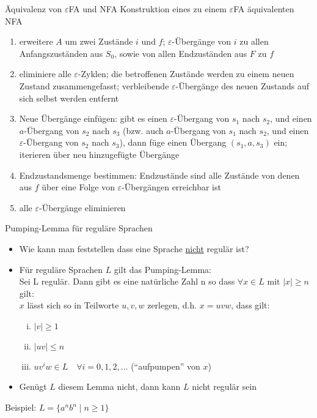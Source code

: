 \begin{frame}{Äquivalenz von $\varepsilon$FA und NFA}
	Konstruktion eines zu einem $\varepsilon$FA äquivalenten NFA
	\begin{enumerate}
		\item erweitere $A$ um zwei Zustände $i$ und $f$; $\varepsilon$-Übergänge von $i$ zu allen Anfangszuständen aus $S_0$, sowie von allen Endzuständen aus $F$ zu $f$
		\item eliminiere alle $\varepsilon$-Zyklen; die betroffenen Zustände werden zu einem neuen Zustand zusammengefasst; verbleibende $\varepsilon$-Übergänge des neuen Zustands auf sich selbst werden entfernt
		\item Neue Übergänge einfügen: gibt es einen $\varepsilon$-Übergang von $s_1$ nach $s_2$, und einen $a$-Übergang von $s_2$ nach $s_3$ (bzw. auch $a$-Übergang von $s_1$ nach $s_2$, und einen $\varepsilon$-Übergang von $s_2$ nach $s_3$), dann füge einen Übergang $(s_1,a,s_3)$ ein; iterieren über neu hinzugefügte Übergänge
		\item Endzustandsmenge bestimmen: Endzustände sind alle Zustände von
		denen aus $f$ über eine Folge von $\varepsilon$-Übergängen erreichbar ist
		\item alle $\varepsilon$-Übergänge eliminieren
	\end{enumerate}
\end{frame}

\begin{frame}{Pumping-Lemma für reguläre Sprachen}
	\begin{itemize}
		\item Wie kann man feststellen dass eine Sprache \underline{nicht} regulär ist?
		\item Für reguläre Sprachen $L$ gilt das Pumping-Lemma:\\
		Sei L regulär. Dann gibt es eine natürliche Zahl n so dass $\forall x \in L \textrm{ mit } |x|\geq n$ gilt:\\
		$x$ lässt sich so in Teilworte $u, v, w$ zerlegen, d.h. $x=uvw$, dass
		gilt:
		\begin{enumerate} [i.]
			\item $|v| \geq 1$
			\item $|uv| \leq n$
			\item $uv^iw \in L\quad \forall i = 0, 1, 2, ...$ ("`aufpumpen"' von $x$)
		\end{enumerate}
		\item Genügt $L$ diesem Lemma nicht, dann kann $L$ nicht regulär sein
	\end{itemize}
	Beispiel: $L=\{a^nb^n\mid n\geq 1\}$
\end{frame}

